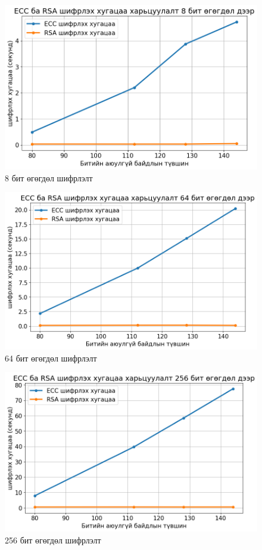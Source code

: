 	\begin{figure}
		\centering
		\includegraphics[scale=0.65]{assets/graphs/1.png}
		\caption{8 бит өгөгдөл шифрлэлт}
		\label{fig:architecture}
	\end{figure}
	\begin{figure}
		\centering
		\includegraphics[scale=0.65]{assets/graphs/2.png}
		\caption{64 бит өгөгдөл шифрлэлт}
		\label{fig:architecture}
	\end{figure}
	\begin{figure}
		\centering
		\includegraphics[scale=0.65]{assets/graphs/3.png}
		\caption{256 бит өгөгдөл шифрлэлт}
		\label{fig:architecture}
	\end{figure}
